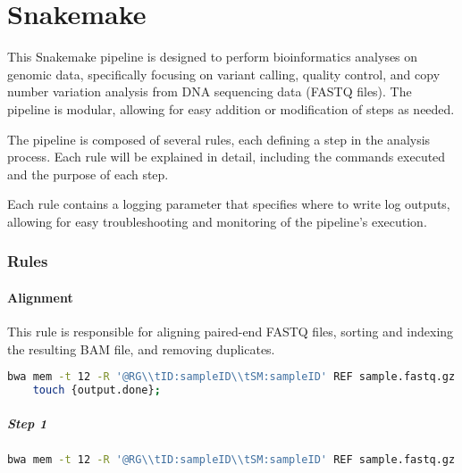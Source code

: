 \newpage
\part{Snakemake}

This Snakemake pipeline is designed to perform bioinformatics analyses on genomic data, specifically focusing on variant calling, quality control, and copy number variation analysis from DNA sequencing data (FASTQ files). The pipeline is modular, allowing for easy addition or modification of steps as needed.

The pipeline is composed of several rules, each defining a step in the analysis process. Each rule will be explained in detail, including the commands executed and the purpose of each step.

Each rule contains a logging parameter that specifies where to write log outputs, allowing for easy troubleshooting and monitoring of the pipeline's execution.

\section{Rules}
\subsection{Alignment}
This rule is responsible for aligning paired-end FASTQ files, sorting and indexing the resulting BAM file, and removing duplicates.

\begin{lstlisting}[breaklines=true, language=bash]
    bwa mem -t 12 -R '@RG\\tID:sampleID\\tSM:sampleID' REF sample.fastq.gz | bamsort inputformat=sam markduplicates=1 rmdup=1 fixmates=1 inputthreads=8 outputthreads=8 M=sample_metrics.txt index=1 O=sample.bam indexfilename=sample.bai;
    touch {output.done};
\end{lstlisting}

\subsubsection*{Step 1}

\begin{lstlisting}[breaklines=true, language=bash]
    bwa mem -t 12 -R '@RG\\tID:sampleID\\tSM:sampleID' REF sample.fastq.gz
\end{lstlisting}

